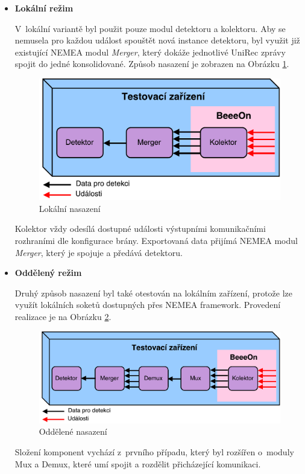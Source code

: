  \begin{itemize}
  \item \textbf{Lokální režim}
  
  V~lokální variantě byl použit pouze modul detektoru a kolektoru. Aby se nemusela pro každou 
  událost spouštět nová instance detektoru, byl využit již existující NEMEA modul \textit{Merger},
  který 
  dokáže jednotlivé UniRec zprávy spojit do jedné konsolidované. Způsob nasazení je zobrazen na Obrázku 
  \ref{obr.option1}.
  
  \begin{figure}[ht]
   \begin{center}
   \includegraphics[scale=0.5]{pictures/deploy-option1}
   \caption{Lokální nasazení}
   \label{obr.option1}
   \end{center}
   \end{figure}
   
   Kolektor vždy odesílá dostupné události výstupními komunikačními rozhraními
   dle konfigurace brány.
   Exportovaná data přijímá NEMEA modul \textit{Merger}, který je spojuje a předává detektoru.
   
  \item \textbf{Oddělený režim} \label{externalMode}
  
  Druhý způsob nasazení byl také otestován na lokálním zařízení, protože lze využít lokálních
  soketů dostupných přes NEMEA framework. Provedení realizace je na Obrázku \ref{obr.option2}.
 
  \begin{figure}[ht]
   \begin{center}
   \includegraphics[scale=0.5]{pictures/deploy-option2}
   \caption{Oddělené nasazení}
   \label{obr.option2}
   \end{center}
   \end{figure}
   
   Složení komponent vychází z~prvního případu, který byl rozšířen o~moduly Mux a Demux, které 
   umí spojit a rozdělit přicházející komunikaci.
 \end{itemize}
 

